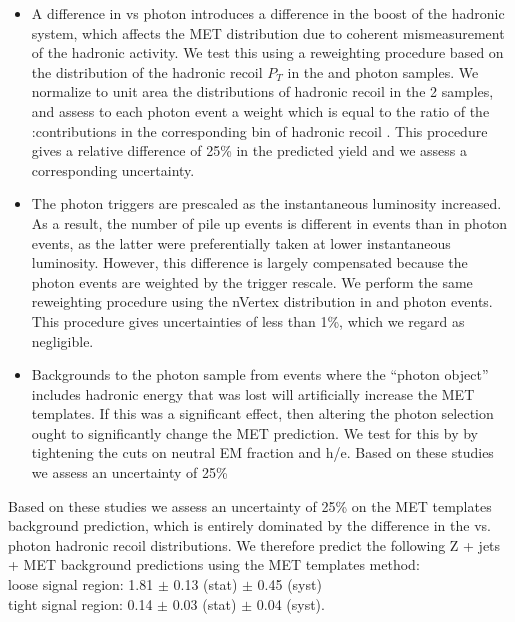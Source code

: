 \begin{itemize}
\item A difference in \Z \pt vs photon \pt introduces a difference in the boost of the hadronic system,
  which affects the MET distribution due to coherent mismeasurement of the hadronic activity. 
  We test this using a reweighting procedure based on the distribution of the hadronic recoil $P_T$ 
  in the \Z and photon samples. We normalize to unit area the distributions of hadronic recoil \pt in the 2 samples,
  and assess to each photon event a weight which is equal to the ratio of the \Z:\pt contributions in the corresponding
  bin of hadronic recoil \pt. This procedure gives a relative difference of 25\% in the predicted yield and
  we assess a corresponding uncertainty.
\item The photon triggers are prescaled as the instantaneous luminosity increased. As a result, the 
  number of pile up events is different in \Z events than in photon events, 
  as the latter were preferentially taken at lower instantaneous luminosity. However, this difference
  is largely compensated because the photon events are weighted by the trigger rescale. We perform the
  same reweighting procedure using the nVertex distribution in \Z and photon events. This procedure gives
  uncertainties of less than 1\%, which we regard as negligible.
\item Backgrounds to the photon sample from events where the ``photon object'' includes 
  hadronic energy that was lost will artificially increase the MET templates. 
  If this was a significant effect, then  altering the photon selection ought to significantly 
  change the MET prediction. We test for this
  by by tightening the cuts on neutral EM fraction and
  h/e. Based on these studies we assess an uncertainty of 25\% 


\end{itemize}

Based on these studies we assess an uncertainty of 25\% 
on the MET templates background prediction,
which is entirely dominated by the difference in the \Z vs. photon hadronic recoil \pt distributions. We therefore 
predict the following Z + jets + MET background predictions using the MET templates method: \\
loose signal region:  1.81 $\pm$ 0.13 (stat) $\pm$ 0.45 (syst) \\
tight signal region:  0.14 $\pm$ 0.03 (stat) $\pm$ 0.04 (syst).

